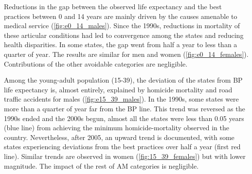 \documentclass{article}
\begin{document}
Reductions in the gap between the observed life expectancy and the best practices between 0 and 14 years are mainly driven by the causes amenable to medical service (\ref{fig:e0_14_males}). Since the 1990s, reductions in mortality of these articular conditions had led to convergence among the states and reducing health disparities. In some states, the gap went from half a year to less than a quarter of year. The results are similar for men and women (\ref{fig:e0_14_females}). Contributions of the other avoidable categories are negligible. 

Among the young-adult population (15-39), the deviation of the states from BP life expectancy is, almost entirely, explained by homicide mortality and road traffic accidents for males (\ref{fig:e15_39_males}). In the 1990s, some states were more than a quarter of year far from the BP line. This trend was reversed as the 1990s ended and the 2000s begun, almost all the states were less than 0.05 years (blue line) from achieving the minimum homicide-mortality observed in the country. Nevertheless, after 2005, an upward trend is documented, with some states experiencing deviations from the best practices over half a year (first red line). Similar trends are observed in women (\ref{fig:15_39_females}) but with lower magnitude. The impact of the rest of AM categories is negligible. 
\end{document}

